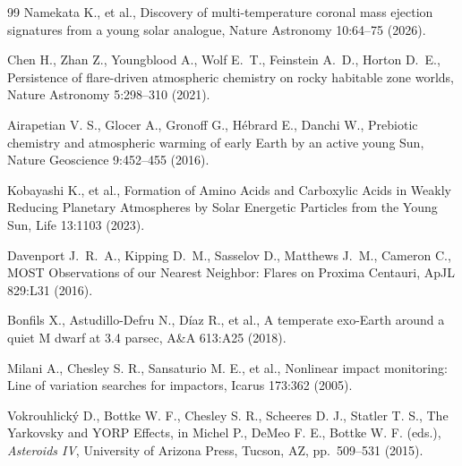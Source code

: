 \begin{thebibliography}{99}
Namekata K., et al., Discovery of multi-temperature coronal mass ejection signatures from a young solar analogue, Nature Astronomy 10:64--75 (2026).

Chen H., Zhan Z., Youngblood A., Wolf E.~T., Feinstein A.~D., Horton D.~E.,
Persistence of flare-driven atmospheric chemistry on rocky habitable zone worlds,
Nature Astronomy 5:298--310 (2021).

Airapetian V. S., Glocer A., Gronoff G., H\'ebrard E., Danchi W., Prebiotic chemistry and atmospheric warming of early Earth by an active young Sun, Nature Geoscience 9:452--455 (2016).

Kobayashi K., et al., Formation of Amino Acids and Carboxylic Acids in Weakly Reducing Planetary Atmospheres by Solar Energetic Particles from the Young Sun, Life 13:1103 (2023).

Davenport J.~R.~A., Kipping D.~M., Sasselov D., Matthews J.~M., Cameron C.,
MOST Observations of our Nearest Neighbor: Flares on Proxima Centauri,
ApJL 829:L31 (2016).

Bonfils X., Astudillo-Defru N., D{\'i}az R., et al.,
A temperate exo-Earth around a quiet M dwarf at 3.4 parsec,
A\&A 613:A25 (2018).

Milani A., Chesley S. R., Sansaturio M. E., et al., Nonlinear impact monitoring: Line of variation searches for impactors, Icarus 173:362 (2005).

Vokrouhlick\'y D., Bottke W. F., Chesley S. R., Scheeres D. J., Statler T. S., The Yarkovsky and YORP Effects, in Michel P., DeMeo F. E., Bottke W. F. (eds.), \textit{Asteroids IV}, University of Arizona Press, Tucson, AZ, pp.~509--531 (2015).

\end{thebibliography}
\endgroup


